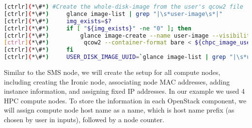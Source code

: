 
\begin{lstlisting}[language=bash,keywords={}]
[ctrlr](*\#*) #Create the whole-disk-image from the user's qcow2 file
[ctrlr](*\#*)     glance image-list | grep "|\s*user-image\s*|"
[ctrlr](*\#*)     img_exists=$?
[ctrlr](*\#*)     if [ "${img_exists}" -ne "0" ]; then
[ctrlr](*\#*)         glance image-create --name user-image --visibility public --disk-format \
[ctrlr](*\#*)          qcow2 --container-format bare < ${chpc_image_user}
[ctrlr](*\#*)     fi
[ctrlr](*\#*)     USER_DISK_IMAGE_UUID=`glance image-list | grep "|\s*user-image\s*|" | awk '{print $2}'`
\end{lstlisting} 


	Similar to the SMS node, we will create the setup for all compute nodes, including creating the Ironic node, associating node MAC addresses, adding instance information, and assigning fixed IP addresses. In our example we used 4 HPC compute nodes. To store the information in each OpenStack component, we will assign compute node host name as a name, which is host name prefix (as chosen by user in inputs), followed by a node counter. 


